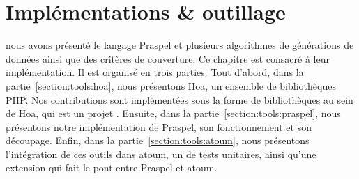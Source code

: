 \chapter{Implémentations \& outillage}
\label{chapter:tools}

\mminitoc

 nous avons présenté
le langage Praspel et plusieurs algorithmes de générations de données ainsi que
des critères de couverture. Ce chapitre est consacré à leur implémentation. Il
est organisé en trois parties. Tout d'abord, dans la
partie~\ref{section:tools:hoa}, nous présentons Hoa, un ensemble de
bibliothèques PHP. Nos contributions sont implémentées sous la forme de
bibliothèques au sein de Hoa, qui est un projet .
Ensuite, dans la partie~\ref{section:tools:praspel}, nous présentons notre
implémentation de Praspel, son fonctionnement et son découpage. Enfin, dans la
partie~\ref{section:tools:atoum}, nous présentons l'intégration de ces outils
dans atoum, un  de tests unitaires, ainsi qu'une extension
qui fait le pont entre Praspel et atoum.

